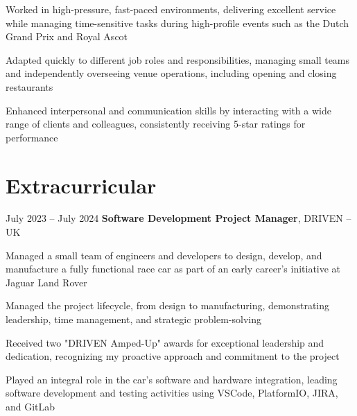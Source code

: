 	\vspace{0.10 cm}
	\begin{onecolentry}
		\begin{highlights}
			\item Worked in high-pressure, fast-paced environments, delivering excellent service while managing time-sensitive tasks during high-profile events such as the Dutch Grand Prix and Royal Ascot
			\item Adapted quickly to different job roles and responsibilities, managing small teams and independently overseeing venue operations, including opening and closing restaurants
			\item Enhanced interpersonal and communication skills by interacting with a wide range of clients and colleagues, consistently receiving 5-star ratings for performance
		\end{highlights}
	\end{onecolentry}
	
	
	\section{Extracurricular}
	
	
	\begin{twocolentry}{
			July 2023 – July 2024
		}
		\textbf{Software Development Project Manager}, DRIVEN -- UK
	\end{twocolentry}
	
	\vspace{0.10 cm}
	\begin{onecolentry}
		\begin{highlights}
			\item Managed a small team of engineers and developers to design, develop, and manufacture a fully functional race car as part of an early career’s initiative at Jaguar Land Rover
			\item Managed the project lifecycle, from design to manufacturing, demonstrating leadership, time management, and strategic problem-solving
			\item Received two "DRIVEN Amped-Up" awards for exceptional leadership and dedication, recognizing my proactive approach and commitment to the project
			\item Played an integral role in the car's software and hardware integration, leading software development and testing activities using VSCode, PlatformIO, JIRA, and GitLab
		\end{highlights}
	\end{onecolentry}
	
